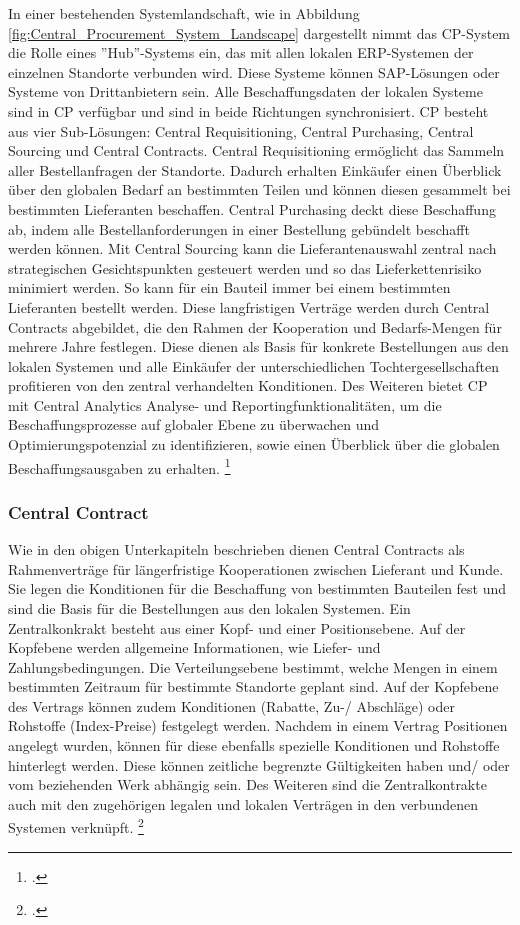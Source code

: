 In einer bestehenden Systemlandschaft, wie in Abbildung \ref{fig:Central_Procurement_System_Landscape} dargestellt nimmt das CP-System die Rolle eines ''Hub''-Systems ein, das mit allen lokalen ERP-Systemen der einzelnen Standorte verbunden wird. Diese Systeme können SAP-Lösungen oder Systeme von Drittanbietern sein. Alle Beschaffungsdaten der lokalen Systeme sind in CP verfügbar und sind in beide Richtungen synchronisiert. CP besteht aus vier Sub-Lösungen: Central Requisitioning, Central Purchasing, Central Sourcing und Central Contracts. Central Requisitioning ermöglicht  das Sammeln aller Bestellanfragen der Standorte. Dadurch erhalten Einkäufer einen Überblick über den globalen Bedarf an bestimmten Teilen und können diesen gesammelt bei bestimmten Lieferanten beschaffen. Central Purchasing deckt diese Beschaffung ab, indem alle Bestellanforderungen in einer Bestellung gebündelt beschafft werden können. Mit Central Sourcing kann die Lieferantenauswahl zentral nach strategischen Gesichtspunkten gesteuert werden und so das Lieferkettenrisiko minimiert werden. So kann \zB für ein Bauteil immer bei einem bestimmten Lieferanten bestellt werden. Diese langfristigen Verträge werden durch Central Contracts abgebildet, die den Rahmen der Kooperation und Bedarfs-Mengen für mehrere Jahre festlegen. Diese dienen als Basis für konkrete Bestellungen aus den lokalen Systemen und alle Einkäufer der unterschiedlichen Tochtergesellschaften profitieren von den zentral verhandelten Konditionen. Des Weiteren bietet CP mit Central Analytics Analyse- und Reportingfunktionalitäten, um die Beschaffungsprozesse auf globaler Ebene zu überwachen und Optimierungspotenzial zu identifizieren, sowie einen Überblick über die globalen Beschaffungsausgaben zu erhalten. \footcite[Vgl.][]{theorie_sap_central_procurement_overview_2024}

\subsubsection{Central Contract} \label{sec:Kapitel23MassChange}

Wie in den obigen Unterkapiteln beschrieben dienen Central Contracts als Rahmenverträge für längerfristige Kooperationen zwischen Lieferant und Kunde. Sie legen die Konditionen für die Beschaffung von bestimmten Bauteilen fest und sind die Basis für die Bestellungen aus den lokalen Systemen. Ein Zentralkonkrakt besteht aus einer Kopf- und einer Positionsebene. Auf der Kopfebene werden allgemeine Informationen, wie Liefer- und Zahlungsbedingungen. Die Verteilungsebene bestimmt, welche Mengen in einem bestimmten Zeitraum für bestimmte Standorte geplant sind. Auf der Kopfebene des Vertrags können zudem Konditionen (Rabatte, Zu-/ Abschläge) oder Rohstoffe (Index-Preise) festgelegt werden. Nachdem in einem Vertrag Positionen angelegt wurden, können für diese ebenfalls spezielle Konditionen und Rohstoffe hinterlegt werden. Diese können zeitliche begrenzte Gültigkeiten haben und/ oder vom beziehenden Werk abhängig sein. Des Weiteren sind die Zentralkontrakte auch mit den zugehörigen legalen und lokalen Verträgen in den verbundenen Systemen verknüpft. \footcite[Vgl.][]{theorie_sap_central_contract_overview_2024}


